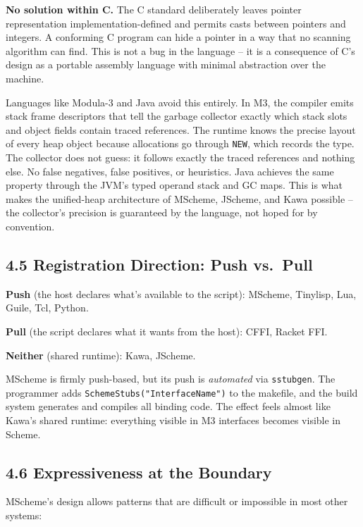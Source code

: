 \documentclass[
  12pt,
]{report}
\newcommand{\passthrough}[1]{#1}
\begin{document}
\textbf{No solution within C.} The C standard deliberately leaves
pointer representation implementation-defined and permits casts between
pointers and integers. A conforming C program can hide a pointer in a
way that no scanning algorithm can find. This is not a bug in the
language -- it is a consequence of C's design as a portable assembly
language with minimal abstraction over the machine.

Languages like Modula-3 and Java avoid this entirely. In M3, the
compiler emits stack frame descriptors that tell the garbage collector
exactly which stack slots and object fields contain traced references.
The runtime knows the precise layout of every heap object because
allocations go through \passthrough{\lstinline!NEW!}, which records the
type. The collector does not guess: it follows exactly the traced
references and nothing else. No false negatives, false positives, or
heuristics. Java achieves the same property through the JVM's typed
operand stack and GC maps. This is what makes the unified-heap
architecture of MScheme, JScheme, and Kawa possible -- the collector's
precision is guaranteed by the language, not hoped for by convention.

\subsection{4.5 Registration Direction: Push
vs.~Pull}\label{registration-direction-push-vs.-pull}

\textbf{Push} (the host declares what's available to the script):
MScheme, Tinylisp, Lua, Guile, Tcl, Python.

\textbf{Pull} (the script declares what it wants from the host): CFFI,
Racket FFI.

\textbf{Neither} (shared runtime): Kawa, JScheme.

MScheme is firmly push-based, but its push is \emph{automated} via
\passthrough{\lstinline!sstubgen!}. The programmer adds
\passthrough{\lstinline!SchemeStubs("InterfaceName")!} to the makefile,
and the build system generates and compiles all binding code. The effect
feels almost like Kawa's shared runtime: everything visible in M3
interfaces becomes visible in Scheme.

\subsection{4.6 Expressiveness at the
Boundary}\label{expressiveness-at-the-boundary}

MScheme's design allows patterns that are difficult or impossible in
most other systems:
\end{document}
